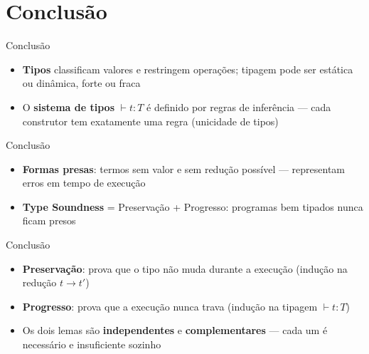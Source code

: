 \section{Conclusão}\label{conclusuxe3o}

\begin{frame}{Conclusão}

    \begin{itemize}

        \item
        \textbf{Tipos} classificam valores e restringem operações; tipagem
        pode ser estática ou dinâmica, forte ou fraca
        \item
        O \textbf{sistema de tipos} \(\vdash t : T\) é definido por regras de
        inferência --- cada construtor tem exatamente uma regra (unicidade de
        tipos)
    \end{itemize}
\end{frame}

\begin{frame}{Conclusão}

    \begin{itemize}

        \item
        \textbf{Formas presas}: termos sem valor e sem redução possível ---
        representam erros em tempo de execução
        \item
        \textbf{Type Soundness} = Preservação + Progresso: programas bem
        tipados nunca ficam presos
    \end{itemize}
\end{frame}

\begin{frame}{Conclusão}

    \begin{itemize}

        \item
        \textbf{Preservação}: prova que o tipo não muda durante a execução
        (indução na redução \(t \to t'\))
        \item
        \textbf{Progresso}: prova que a execução nunca trava (indução na
        tipagem \(\vdash t : T\))
        \item
        Os dois lemas são \textbf{independentes} e \textbf{complementares} ---
        cada um é necessário e insuficiente sozinho
    \end{itemize}
\end{frame}
